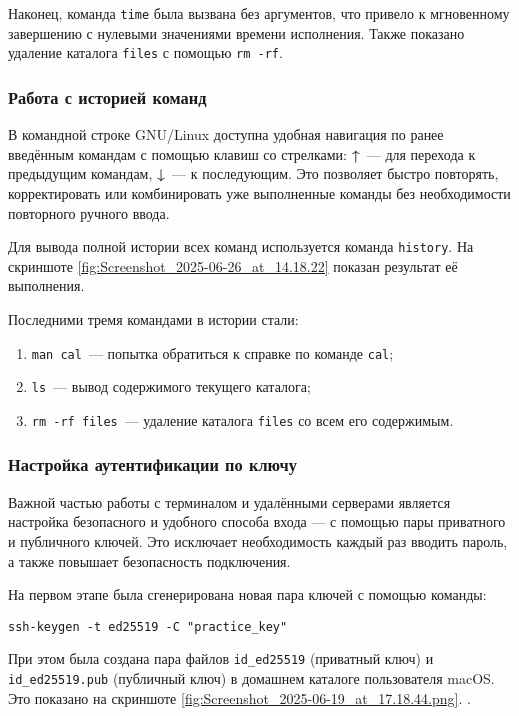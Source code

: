 Наконец, команда \texttt{time} была вызвана без аргументов, что привело к мгновенному завершению с нулевыми значениями времени исполнения. Также показано удаление каталога \texttt{files} с помощью \texttt{rm -rf}.

\subsubsection*{Работа с историей команд}

В командной строке GNU/Linux доступна удобная навигация по ранее введённым командам с помощью клавиш со стрелками: \textbf{↑}~— для перехода к предыдущим командам, \textbf{↓}~— к последующим. Это позволяет быстро повторять, корректировать или комбинировать уже выполненные команды без необходимости повторного ручного ввода.

Для вывода полной истории всех команд используется команда \texttt{history}. На скриншоте \ref{fig:Screenshot_2025-06-26_at_14.18.22} показан результат её выполнения.

Последними тремя командами в истории стали:
\begin{enumerate}
    \item \texttt{man cal}~— попытка обратиться к справке по команде \texttt{cal};
    \item \texttt{ls}~— вывод содержимого текущего каталога;
    \item \texttt{rm -rf files}~— удаление каталога \texttt{files} со всем его содержимым.
\end{enumerate}


\subsubsection*{Настройка аутентификации по ключу}

Важной частью работы с терминалом и удалёнными серверами является настройка безопасного и удобного способа входа — с помощью пары приватного и публичного ключей. Это исключает необходимость каждый раз вводить пароль, а также повышает безопасность подключения.

На первом этапе была сгенерирована новая пара ключей с помощью команды:
\begin{verbatim}
ssh-keygen -t ed25519 -C "practice_key"
\end{verbatim}
При этом была создана пара файлов \verb|id_ed25519| (приватный ключ) и \verb|id_ed25519.pub| (публичный ключ) в домашнем каталоге пользователя macOS. Это показано на скриншоте \ref{fig:Screenshot_2025-06-19_at_17.18.44.png}.
.

